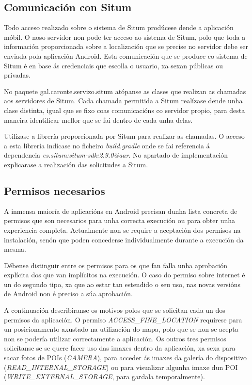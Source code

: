 \subsection{Comunicación con Situm}
Todo acceso realizado sobre o sistema de Situm prodúcese dende a aplicación móbil. O noso servidor non pode ter acceso ao sistema de Situm, polo que toda a información proporcionada sobre a localización que se precise no servidor debe ser enviada pola aplicación Android. Esta comunicación que se produce co sistema de Situm é en base ás credenciais que escolla o usuario, xa sexan públicas ou privadas.

No paquete gal.caronte.servizo.situm atópanse as clases que realizan as chamadas aos servidores de Situm. Cada chamada permitida a Situm realízase dende unha clase distinta, igual que se fixo coas comunicacións co servidor propio, para desta maneira identificar mellor que se fai dentro de cada unha delas.

Utilízase a librería proporcionada por Situm para realizar as chamadas. O acceso a esta librería indícase no ficheiro \emph{build.gradle} onde se fai referencia á dependencia \emph{es.situm:situm-sdk:2.9.0@aar}. No apartado de implementación explicarase a realización das solicitudes a Situm.

\subsection{Permisos necesarios}
A inmensa maioría de aplicacións en Android precisan dunha lista concreta de permisos que son necesarios para unha correcta execución ou para obter unha experiencia completa. Actualmente non se require a aceptación dos permisos na instalación, senón que poden concederse individualmente durante a execución da mesma.

Débense distinguir entre os permisos para os que fan falla unha aprobación explícita dos que van implícitos na execución. O caso do permiso sobre internet é un do segundo tipo, xa que ao estar tan estendido o seu uso, nas novas versións de Android non é preciso a súa aprobación.

A continuación describiranse os motivos polos que se solicitan cada un dos permisos da aplicación. O permiso \emph{ACCESS\_FINE\_LOCATION} requírese para un posicionamento axustado na utilización do mapa, polo que se non se acepta non se podería utilizar correctamente a aplicación. Os outros tres permisos solicítanse se se quere facer uso das imaxes dentro da aplicación, xa sexa para sacar fotos de POIs (\emph{CAMERA}), para acceder ás imaxes da galería do dispositivo (\emph{READ\_INTERNAL\_STORAGE}) ou para visualizar algunha imaxe dun POI (\emph{WRITE\_EXTERNAL\_STORAGE}, para gardala temporalmente).
